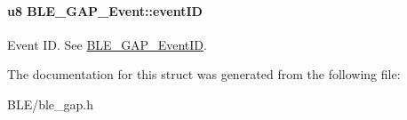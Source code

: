 \paragraph[{\texorpdfstring{event\+ID}{eventID}}]{\setlength{\rightskip}{0pt plus 5cm}u8 B\+L\+E\+\_\+\+G\+A\+P\+\_\+\+Event\+::event\+ID}\hypertarget{struct_b_l_e___g_a_p___event_af1575452800a56e0d60c352094d681dc}{}\label{struct_b_l_e___g_a_p___event_af1575452800a56e0d60c352094d681dc}
Event ID. See \hyperlink{group___b_l_e___g_a_p_gab40cc5a5c434d2d7d9cb7c22634f7b61}{B\+L\+E\+\_\+\+G\+A\+P\+\_\+\+Event\+ID}. 

The documentation for this struct was generated from the following file\+:\begin{DoxyCompactItemize}
\item 
B\+L\+E/ble\+\_\+gap.\+h\end{DoxyCompactItemize}
